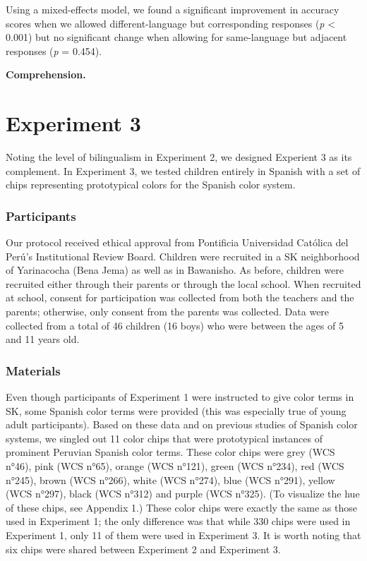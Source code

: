 \documentclass[,man,floatsintext]{apa6}
\theoremstyle{definition}
\theoremstyle{definition}
\theoremstyle{definition}
\theoremstyle{remark}
\begin{document}
Using a mixed-effects model, we found a significant improvement in
accuracy scores when we allowed different-language but corresponding
responses (\emph{p} \textless{} 0.001) but no significant change when
allowing for same-language but adjacent responses (\emph{p} = 0.454).

\textbf{Comprehension.}

\section{Experiment 3}\label{experiment-3}

Noting the level of bilingualism in Experiment 2, we designed Experient
3 as its complement. In Experiment 3, we tested children entirely in
Spanish with a set of chips representing prototypical colors for the
Spanish color system.

\subsubsection{Participants}\label{participants-2}

Our protocol received ethical approval from Pontificia Universidad
Católica del Perú's Institutional Review Board. Children were recruited
in a SK neighborhood of Yarinacocha (Bena Jema) as well as in Bawanisho.
As before, children were recruited either through their parents or
through the local school. When recruited at school, consent for
participation was collected from both the teachers and the parents;
otherwise, only consent from the parents was collected. Data were
collected from a total of 46 children (16 boys) who were between the
ages of 5 and 11 years old.

\subsubsection{Materials}\label{materials-2}

Even though participants of Experiment 1 were instructed to give color
terms in SK, some Spanish color terms were provided (this was especially
true of young adult participants). Based on these data and on previous
studies of Spanish color systems, we singled out 11 color chips that
were prototypical instances of prominent Peruvian Spanish color terms.
These color chips were grey (WCS n°46), pink (WCS n°65), orange (WCS
n°121), green (WCS n°234), red (WCS n°245), brown (WCS n°266), white
(WCS n°274), blue (WCS n°291), yellow (WCS n°297), black (WCS n°312) and
purple (WCS n°325). (To visualize the hue of these chips, see Appendix
1.) These color chips were exactly the same as those used in Experiment
1; the only difference was that while 330 chips were used in Experiment
1, only 11 of them were used in Experiment 3. It is worth noting that
six chips were shared between Experiment 2 and Experiment 3.
\end{document}
